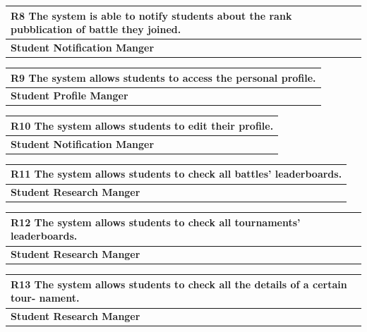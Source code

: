 \documentclass[12pt, a4paper]{report}
\begin{document}
\begin{table}[H]
    \begin{tabularx}{\textwidth}{X}
    \textbf{R8} The system is able to notify students about the rank pubblication of
    battle they joined.\\
    \hline 
    \textbf{Student Notification Manger}
    \end{tabularx}
\end{table}

\begin{table}[H]
    \begin{tabularx}{\textwidth}{X}
    \textbf{R9} The system allows students to access the personal profile.\\
    \hline 
    \textbf{Student Profile Manger}
\end{tabularx}
\end{table}

\begin{table}[H]
    \begin{tabularx}{\textwidth}{X}
    \textbf{R10} The system allows students to edit their profile.\\
    \hline 
    \textbf{Student Notification Manger}
\end{tabularx}
\end{table}

\begin{table}[H]
    \begin{tabularx}{\textwidth}{X}
    \textbf{R11} The system allows students to check all battles’ leaderboards.\\
    \hline 
    \textbf{Student Research Manger}
\end{tabularx}
\end{table}

\begin{table}[H]
    \begin{tabularx}{\textwidth}{X}
    \textbf{R12} The system allows students to check all tournaments’ leaderboards.\\
    \hline 
    \textbf{Student Research Manger}
\end{tabularx}
\end{table}

\begin{table}[H]
    \begin{tabularx}{\textwidth}{X}
    \textbf{R13} The system allows students to check all the details of a certain tour-
    nament.\\
    \hline 
    \textbf{Student Research Manger}
\end{tabularx}
\end{table}
\end{document}
